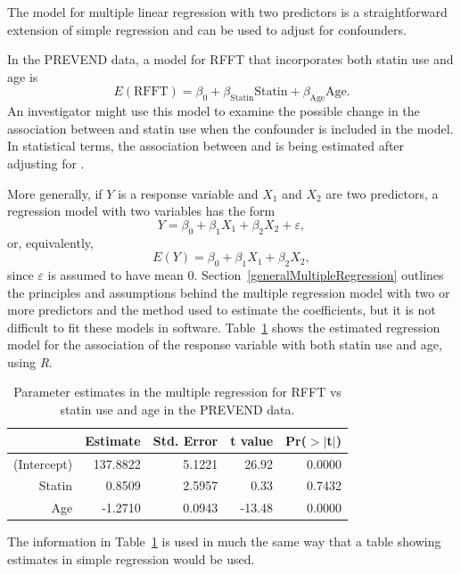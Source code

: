 The model for multiple linear regression with two predictors is a straightforward extension of simple regression and can be used to adjust for confounders.  

In the PREVEND data, a model for RFFT that incorporates both statin use and age is
 \[
    E(\text{RFFT}) = \beta_0 + \beta_{\text{Statin}}\text{Statin} + \beta_{\text{Age}}\text{Age}.
	\label{RFFTStatinAgeEquation}
 \]
An investigator might use this model to examine the possible change in the association between  and statin use when the confounder  is included in the model.  In statistical terms, the association between  and  is being estimated after adjusting for .

More generally, if $Y$ is a response variable and $X_1$ and $X_2$ are two predictors, a regression model with two variables has the form 
\[
Y = \beta_0 + \beta_1 X_1 + \beta_2 X_2 + \varepsilon,
\]
or, equivalently,
\[
E(Y) = \beta_0 + \beta_1 X_1 + \beta_2 X_2,
\]
since $\varepsilon$ is assumed to have mean 0.  Section~\ref{generalMultipleRegression} outlines the principles and assumptions behind the multiple regression model with two or more predictors and the method used to estimate the coefficients, but it is not difficult to fit these models in software.  Table~\ref{RFFTStatinAgeRegression} shows the estimated regression model for the association of the response variable  with both statin use and age, using \textsl{R}.  
 
 \begin{table}[ht]
 \centering
 \begin{tabular}{rrrrr}
   \hline
  & Estimate & Std. Error & t value & Pr($>$$|$t$|$) \\ 
   \hline
 (Intercept) & 137.8822 & 5.1221 & 26.92 & 0.0000 \\ 
   Statin & 0.8509 & 2.5957 & 0.33 & 0.7432 \\ 
   Age & -1.2710 & 0.0943 & -13.48 & 0.0000 \\ 
    \hline
 \end{tabular}
 \caption{Parameter estimates in the multiple regression for RFFT vs statin use and age in the PREVEND data.}
 \label{RFFTStatinAgeRegression}
 \end{table}
 

The information in Table~\ref{RFFTStatinAgeRegression} is used in much the same way that a table showing estimates in simple regression would be used.

